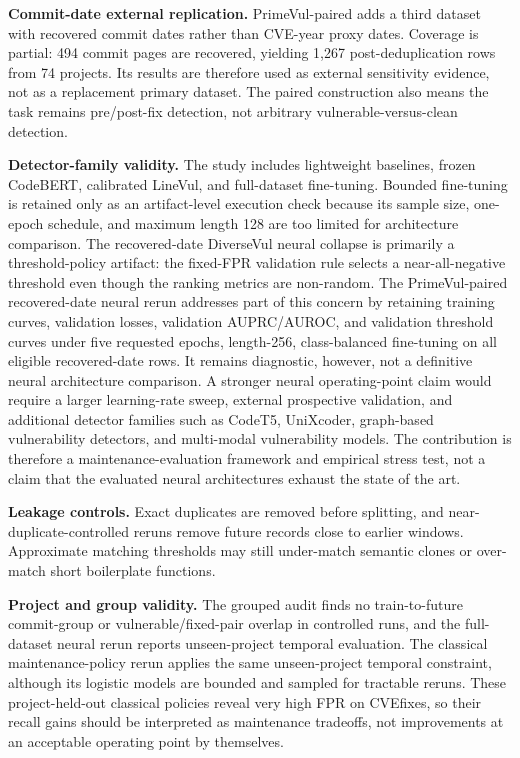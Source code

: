 \documentclass[a4paper,fleqn]{cas-dc}
\begin{document}
\textbf{Commit-date external replication.} PrimeVul-paired adds a third
dataset with recovered commit dates rather than CVE-year proxy dates. Coverage
is partial: 494 commit pages are recovered, yielding 1,267 post-deduplication
rows from 74 projects. Its results are therefore used as external sensitivity
evidence, not as a replacement primary dataset. The paired construction also
means the task remains pre/post-fix detection, not arbitrary
vulnerable-versus-clean detection.

\textbf{Detector-family validity.} The study includes lightweight baselines,
frozen CodeBERT, calibrated LineVul, and full-dataset fine-tuning. Bounded
fine-tuning is retained only as an artifact-level execution check because its
sample size, one-epoch schedule, and maximum length 128 are too limited for
architecture comparison. The recovered-date DiverseVul neural collapse is
primarily a threshold-policy artifact: the fixed-FPR validation rule selects a
near-all-negative threshold even though the ranking metrics are non-random.
The PrimeVul-paired recovered-date neural rerun addresses part of this concern
by retaining training curves, validation losses, validation AUPRC/AUROC, and
validation threshold curves under five requested epochs, length-256,
class-balanced fine-tuning on all eligible recovered-date rows. It remains
diagnostic, however, not a definitive neural architecture comparison. A
stronger neural operating-point claim would require a larger learning-rate
sweep, external prospective validation, and additional detector families such
as CodeT5, UniXcoder, graph-based vulnerability detectors, and multi-modal
vulnerability models. The contribution is therefore a maintenance-evaluation
framework and empirical stress test, not a claim that the evaluated neural
architectures exhaust the state of the art.

\textbf{Leakage controls.} Exact duplicates are removed before splitting, and
near-duplicate-controlled reruns remove future records close to earlier
windows. Approximate matching thresholds may still under-match semantic clones
or over-match short boilerplate functions.

\textbf{Project and group validity.} The grouped audit finds no train-to-future
commit-group or vulnerable/fixed-pair overlap in controlled runs, and the
full-dataset neural rerun reports unseen-project temporal evaluation. The
classical maintenance-policy rerun applies the same unseen-project temporal
constraint, although its logistic models are bounded and sampled for tractable
reruns. These project-held-out classical policies reveal very high FPR on
CVEfixes, so their recall gains should be interpreted as maintenance tradeoffs,
not improvements at an acceptable operating point by themselves.
\end{document}
